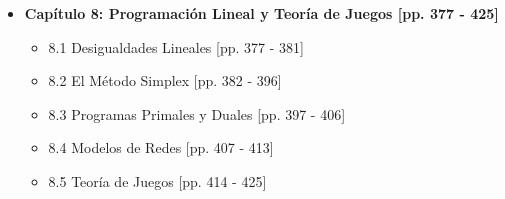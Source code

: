 \documentclass[11pt,a4paper]{article}
\begin{document}
\begin{itemize}
    \item \textbf{Capítulo 8: Programación Lineal y Teoría de Juegos [pp. 377 - 425]}
    \begin{itemize}
        \item 8.1 Desigualdades Lineales [pp. 377 - 381]
        \item 8.2 El Método Simplex [pp. 382 - 396]
        \item 8.3 Programas Primales y Duales [pp. 397 - 406]
        \item 8.4 Modelos de Redes [pp. 407 - 413]
        \item 8.5 Teoría de Juegos [pp. 414 - 425]
    \end{itemize}
\end{itemize}
\end{document}
